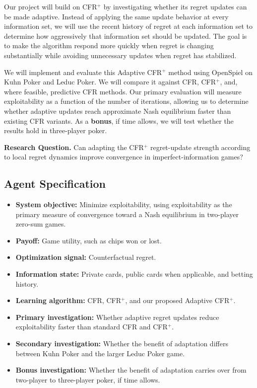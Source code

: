 \documentclass{article}
\begin{document}
Our project will build on CFR$^+$ by investigating whether its regret updates
can be made adaptive. Instead of applying the same update behavior at
every information set, we will use the recent history of regret at each
information set to determine how aggressively that information set should be
updated. The goal is to make the algorithm respond more quickly when regret is
changing substantially while avoiding unnecessary updates when regret has
stabilized.

We will implement and evaluate this Adaptive CFR$^+$ method using OpenSpiel
on Kuhn Poker and Leduc Poker. We will compare it against CFR, CFR$^+$, and,
where feasible, predictive CFR methods. Our primary evaluation will measure
exploitability as a function of the number of iterations, allowing us to
determine whether adaptive updates reach approximate Nash equilibrium faster
than existing CFR variants. As a \textbf{bonus}, if time allows, we will test
whether the results hold in three-player poker.

\begin{rqbox}
\textbf{\color{deepBlue}Research Question.} Can adapting the CFR$^+$ regret-update strength according to local
regret dynamics improve convergence in imperfect-information games?
\end{rqbox}

\subsection*{Agent Specification}
\begin{itemize}
\item \textbf{System objective:} Minimize exploitability, using exploitability
as the primary measure of convergence toward a Nash equilibrium in
two-player zero-sum games.
\item \textbf{Payoff:} Game utility, such as chips won or lost.
\item \textbf{Optimization signal:} Counterfactual regret.
\item \textbf{Information state:} Private cards, public cards when applicable,
and betting history.
\item \textbf{Learning algorithm:} CFR, CFR$^+$, and our proposed Adaptive
CFR$^+$.
\item \textbf{Primary investigation:} Whether adaptive regret updates reduce
exploitability faster than standard CFR and CFR$^+$.
\item \textbf{Secondary investigation:} Whether the benefit of adaptation
differs between Kuhn Poker and the larger Leduc Poker game.
\item \textbf{Bonus investigation:} Whether the benefit of adaptation carries
over from two-player to three-player poker, if time allows.
\end{itemize}
\end{document}
